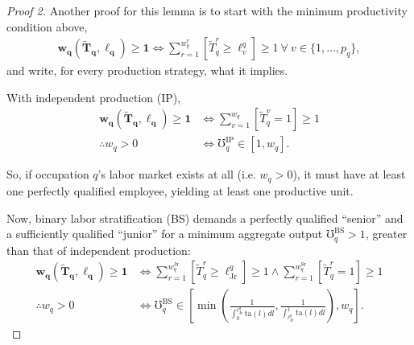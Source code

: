 \documentclass[hidelinks, nonatbib]{elsarticle}
\begin{document}
\begin{lemma}
    \begin{proof}[Proof 2]
        Another proof for this lemma is to start with the minimum productivity condition above,
        \begin{gather}
            \boldsymbol{w_q}(
                \boldsymbol{\tilde{T}_q},
                \boldsymbol{\ell_q}
            )
            \geq
            \boldsymbol{1}
            \iff
            \sum_{r=1}^{w_{q}^{v}}
            [\tilde{T}_{q}^{r} \geq \ell_{v}^{q}]
            \geq
            1
            \
            \forall
            \
            v \in \{1, \dots, p_q\}
            ,
        \end{gather}
        and write, for every production strategy, what it implies. 

        With independent production (IP),
        \begin{align}
            \boldsymbol{w_q}(
                \boldsymbol{\tilde{T}_q},
                \boldsymbol{\ell_q}
            )
            \geq
            \boldsymbol{1}
            &\iff
            \sum_{v=1}^{w_{q}}
            [\tilde{T}_{q}^{v} = 1]
            \geq
            1
            \\
            \therefore
            w_q > 0
            &\iff
            \mho_{q}^{\text{IP}}
            \in [1, w_q]
            .
        \end{align}

        So, if occupation $q$'s labor market exists at all (i.e. $w_q > 0$), it must have at least one perfectly qualified employee, yielding at least one productive unit.

        Now, binary labor stratification (BS) demands a perfectly qualified ``senior'' and a sufficiently qualified ``junior'' for a minimum aggregate output $\mho_{q}^{\text{BS}} > 1$, greater than that of independent production:
        \begin{align}
            \boldsymbol{w_q}(
                \boldsymbol{\tilde{T}_q},
                \boldsymbol{\ell_q}
            )
            \geq
            \boldsymbol{1}
            &\iff
            \sum_{r=1}^{w_{q}^{\text{Jr}}}
            [\tilde{T}_{q}^{r} \geq \ell_{\text{Jr}}^{q}]
            \geq
            1
            \land
            \sum_{r=1}^{w_{q}^{\text{Sr}}}
            [\tilde{T}_{q}^{r} = 1]
            \geq
            1
            \\
            \therefore
            w_q > 0
            &\iff
            \mho_{q}^{\text{BS}}
            \in
            \left[
                \min\left(
                    \frac{
                        1
                    }{
                        \int_{0}^{\ell_{\text{Jr}}^{q}}
                        \text{ta}(l)dl
                    }
                    ,
                    \frac{
                        1
                    }{
                        \int_{\ell_{\text{Jr}}^{q}}^{1}
                        \text{ta}(l)dl
                    }
                \right)
                ,
                w_q
            \right]
            .
        \end{align}


\end{proof}
\end{lemma}
\end{document}
